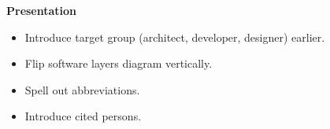 \textbf{Presentation}

\begin{itemize}
\item Introduce target group (architect, developer, designer) earlier.
\item Flip software layers diagram vertically.
\item Spell out abbreviations.
\item Introduce cited persons.
\end{itemize}